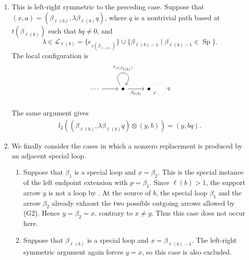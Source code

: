 \documentclass[11pt,a4paper,reqno]{amsart}
\newcommand{\mL}{\mathcal L}
\newcommand{\Sp}{\operatorname{Sp}}
\newcommand{\para}[2]{(#1,#2)}
\newcommand{\ep}{\varepsilon}
\newcommand{\bet}{\beta_{\ell(b)}}
\theoremstyle{plain}
\theoremstyle{definition}
\numberwithin{equation}{section}
\begin{document}
\begin{enumerate}
		\item This is left-right symmetric to the preceding case.  Suppose that
		$\para{x}{a}=\para{\bet}{\lambda\bet q}$,
		where $q$ is a nontrivial path based at $t(\bet)$ such that $bq\neq0$,
		and
		\[
		\lambda\in\mL_{\ell(b)}
		=
		\{e_{s(\bet)}\}
		\cup
		\{\beta_{\ell(b)-1}\mid\beta_{\ell(b)-1}\in\Sp\}.
		\]
		The local configuration is
		\[
		\begin{tikzcd}
			\cdots & \bullet & \bullet
			\arrow[from=1-1, to=1-2]
			\arrow["{\ep_{s(\bet)}}", from=1-2, to=1-2, loop, in=55, out=125, distance=10mm]
			\arrow["\bet"', from=1-2, to=1-3]
			\arrow["q", dotted, from=1-3, to=1-3, loop, in=325, out=35, distance=10mm]
		\end{tikzcd}
		\]
		The same argument gives
		\begin{align}
			l_2(\para{\bet}{\lambda\bet q}\otimes\para{y}{b})
			=
			\para{y}{bq}.
			\label{eq:xneqy-right-boundary}
		\end{align}
		
		\item We finally consider the cases in which a nonzero replacement is produced
		by an adjacent special loop.
		\begin{enumerate}
			\item Suppose that $\beta_1$ is a special loop and $x=\beta_2$.
			This is the special instance of the left endpoint extension with
			$p=\beta_1$.  Since $\ell(b)>1$, the support arrow $y$ is not a loop
			by .  At the source of $b$, the special loop
			$\beta_1$ and the arrow $\beta_2$ already exhaust the two possible
			outgoing arrows allowed by \textup{(G2)}.  Hence $y=\beta_2=x$,
			contrary to $x\neq y$.  Thus this case does not occur here.
			
			\item Suppose that $\bet$ is a special loop and
			$x=\beta_{\ell(b)-1}$.  The left-right symmetric argument again
			forces $y=x$, so this case is also excluded.
			

\end{enumerate}
\end{enumerate}
\end{document}

